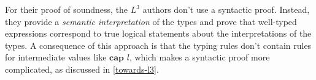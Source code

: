 \documentclass[]{unswthesis}
\newcommand{\ptr}[1]{\textbf{ptr $#1$}}
\newcommand{\capa}[1]{\textbf{cap $#1$}}
\newcommand{\lquine}{\left\ulcorner}
\newcommand{\rquine}{\right\urcorner}
\let\c\texttt
\let\i\textit
\begin{document}
For their proof of soundness, the $L^3$ authors don't use a syntactic proof. Instead, they provide a \i{semantic interpretation} of the types and prove that well-typed expressions correspond to true logical statements about the interpretations of the types. A consequence of this approach is that the typing rules don't contain rules for intermediate values like $\capa{l}$, which makes a syntactic proof more complicated, as discussed in \cref{towards-l3}.





\end{document}
